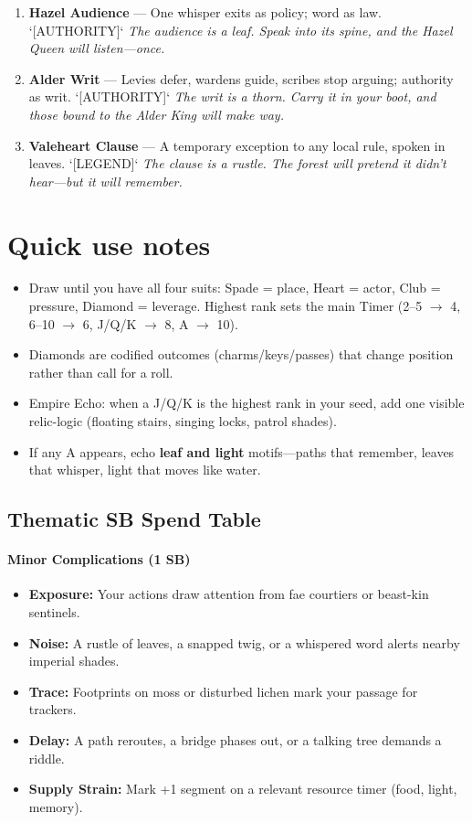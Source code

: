 \begin{enumerate}
  \hfill \textit{The favor is a chip of amber. The Shardwright will come when you break it.}
\item[Q] \textbf{Hazel Audience} --- One whisper exits as policy; word as law. `[AUTHORITY]`
  \hfill \textit{The audience is a leaf. Speak into its spine, and the Hazel Queen will listen---once.}
\item[K] \textbf{Alder Writ} --- Levies defer, wardens guide, scribes stop arguing; authority as writ. `[AUTHORITY]`
  \hfill \textit{The writ is a thorn. Carry it in your boot, and those bound to the Alder King will make way.}
\item[A] \textbf{Valeheart Clause} --- A temporary exception to any local rule, spoken in leaves. `[LEGEND]`
  \hfill \textit{The clause is a rustle. The forest will pretend it didn't hear---but it will remember.}
\end{enumerate}

\section*{Quick use notes}
\label{sec:valewood-quick-use}
\begin{itemize}
\item Draw until you have all four suits: Spade = place, Heart = actor, Club = pressure, Diamond = leverage. Highest rank sets the main Timer (2--5 $\rightarrow$ 4, 6--10 $\rightarrow$ 6, J/Q/K $\rightarrow$ 8, A $\rightarrow$ 10).
\item Diamonds are codified outcomes (charms/keys/passes) that change position rather than call for a roll.
\item Empire Echo: when a J/Q/K is the highest rank in your seed, add one visible relic-logic (floating stairs, singing locks, patrol shades).
\item If any A appears, echo \textbf{leaf and light} motifs---paths that remember, leaves that whisper, light that moves like water.
\end{itemize}

\subsection*{Thematic SB Spend Table}
\label{sec:valewood-sb}
\paragraph{Minor Complications (1 SB)}
\begin{itemize}
\item \textbf{Exposure:} Your actions draw attention from fae courtiers or beast-kin sentinels.
\item \textbf{Noise:} A rustle of leaves, a snapped twig, or a whispered word alerts nearby imperial shades.
\item \textbf{Trace:} Footprints on moss or disturbed lichen mark your passage for trackers.
\item \textbf{Delay:} A path reroutes, a bridge phases out, or a talking tree demands a riddle.
\item \textbf{Supply Strain:} Mark +1 segment on a relevant resource timer (food, light, memory).
\end{itemize}

